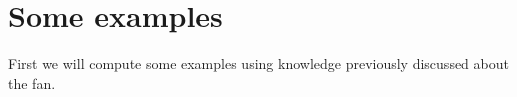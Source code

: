 \section{Some examples}

First we will compute some examples using knowledge previously
discussed about the \grob fan.





